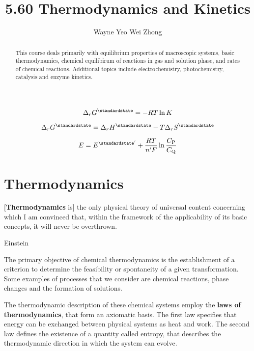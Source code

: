 \documentclass{article}
\title{5.60 Thermodynamics and Kinetics}
\author{Wayne Yeo Wei Zhong}
\numberwithin{theorem}{section}
\numberwithin{corollary}{section}
\numberwithin{postulate}{section}
\numberwithin{lemma}{section}
\numberwithin{definition}{section}
\begin{document}
\maketitle

\begin{abstract}
  This course deals primarily with equilibrium properties of macroscopic
  systems, basic thermodynamics, chemical equilibirum of reactions in gas and
  solution phase, and rates of chemical reactions. Additional topics include
  electrochemistry, photochemistry, catalysis and enzyme kinetics.
\end{abstract}

\tableofcontents

\newpage

\section*{}
\bigskip

\begin{equation*}
  \Delta_r G^{\standardstate} = -RT\ln{K}
\end{equation*}

\begin{equation*}
\Delta_r G^{\standardstate} = \Delta_r H^{\standardstate} - T \Delta_r S^{\standardstate}
\end{equation*}

\begin{equation*}
  E = E^{\standardstate'} + \frac{RT}{n'F} \ln{\frac{C_\mathrm{P}}{C_\mathrm{Q}}}
\end{equation*}
\newpage

\part{Thermodynamics}

\epigraph{[\textbf{Thermodynamics} is] the only physical theory of universal
content concerning which I am convinced that, within the framework of the
applicability of its basic concepts, it will never be overthrown.}{Einstein}

The primary objective of chemical thermodynamics is the establishment of a
criterion to determine the feasibility or spontaneity of a given
transformation. Some examples of processes that we consider are chemical
reactions, phase changes and the formation of solutions. 

The thermodynamic description of these chemical systems employ the \textbf{laws
of thermodynamics}, that form an axiomatic basis. The first law specifies that
energy can be exchanged between physical systems as heat and work.
The second law defines the existence of a quantity called entropy, that
describes the thermodynamic direction in which the system can evolve.
\end{document}
